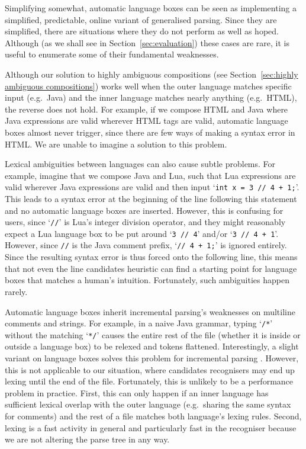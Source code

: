\documentclass[sigplan,screen]{acmart}\settopmatter{printfolios=true,printccs=false,printacmref=false}
\begin{document}
Simplifying somewhat, automatic language boxes can be seen as implementing a
simplified, predictable, online variant of generalised parsing. Since they are
simplified, there are situations where they do not perform as well as hoped.
Although (as we shall see in Section~\ref{sec:evaluation}) these cases are
rare, it is useful to enumerate some of their fundamental weaknesses.

Although our solution to highly ambiguous compositions (see Section~\ref{sec:highly
ambiguous compositions}) works well when the outer language matches specific
input (e.g.~Java) and the inner language matches nearly anything (e.g.~HTML),
the reverse does not hold. For example, if we compose HTML and Java where
Java expressions are valid wherever HTML tags are valid, automatic language
boxes almost never trigger, since there are few ways of making a syntax error
in HTML. We are unable to imagine a solution to this problem.

Lexical ambiguities between languages can also cause subtle problems. For
example, imagine that we compose Java and Lua, such that Lua expressions are
valid wherever Java expressions are valid and then input `\texttt{int x = 3 //
4 + 1;}'. This leads to a syntax error at the beginning of the line following
this statement and no automatic language boxes are inserted. However, this is
confusing for users, since `\texttt{//}' is Lua's integer division operator,
and they might reasonably expect a Lua language box to be put around `\texttt{3
// 4}' and/or `\texttt{3 // 4 + 1}'. However, since \texttt{//} is the Java
comment prefix, `\texttt{// 4 + 1;}' is ignored entirely. Since the resulting
syntax error is thus forced onto the following line, this means that not even
the line candidates heuristic can find a starting point for language boxes that
matches a human's intuition. Fortunately, such ambiguities happen
rarely.

Automatic language boxes inherit incremental parsing's weaknesses on multiline
comments and strings. For example, in a naive Java grammar, typing
`\texttt{/*}' without the matching `\texttt{*/}' causes the entire rest of the
file (whether it is inside or outside a language box) to be relexed and tokens
flattened. Interestingly, a slight variant on language boxes solves this problem
for incremental parsing \cite[p.~108--122]{diekmann18editing}.
However, this is not applicable to our situation, where candidates
recognisers may end up lexing until the end of the file. Fortunately, this is
unlikely to be a performance problem in practice. First, this can only happen
if an inner language has sufficient lexical overlap with the outer language
(e.g.~sharing the same syntax for comments) and the rest of a file matches both
language's lexing rules.  Second, lexing is a fast activity in general and
particularly fast in the recogniser because we are not altering the parse tree
in any way.
\end{document}
